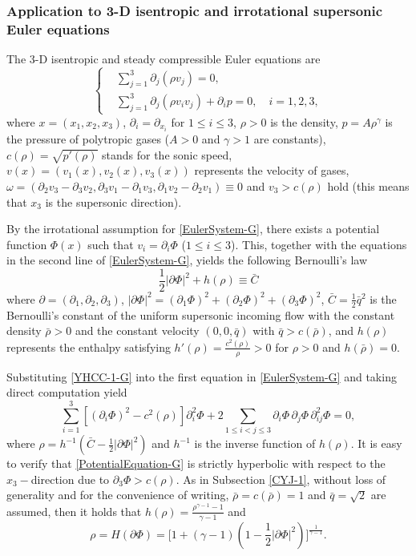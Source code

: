 \documentclass[11pt,twoside]{article}
\def\f{\frac}
\def\p{\partial}
\theoremstyle{plain}
\theoremstyle{definition}
\numberwithin{equation}{section}
\begin{document}
\subsubsection{Application to 3-D isentropic
and irrotational supersonic Euler equations}\label{CYJ-2}

The 3-D isentropic and steady compressible Euler equations are
\begin{equation}\label{EulerSystem-G}
\left\{
\begin{aligned}
&\displaystyle\sum_{j = 1}^{3} \partial_{j} \left( \rho v_{j} \right) = 0, \\
&\displaystyle\sum_{j = 1}^{3} \partial_{j} \left( \rho v_{i} v_{j} \right) + \partial_{i} p = 0 ,\quad i = 1, 2, 3,
\end{aligned}
\right.
\end{equation}
where $x = (x_1, x_2, x_3)$, $\partial_i= \partial_{x_i}$ for $1\le i\le 3$, $\rho>0$ is the density, $p=A\rho^{\gamma}$ is the pressure
of polytropic gases ($A>0$ and $\gamma>1$ are constants), $c(\rho)=\sqrt{p'(\rho)}$ stands for the sonic speed,
$v(x) = \left( v_1(x), v_2(x), v_3(x) \right)$ represents the velocity of gases,
$\omega=(\p_2v_3-\p_3v_2, \p_3v_1-\p_1v_3, \p_1v_2-\p_2v_1)\equiv 0$ and $v_3>c(\rho)$ hold
(this means that $x_3$ is the supersonic direction).

By the irrotational assumption for \eqref{EulerSystem-G}, there exists a potential function $\Phi(x)$
such that $v_i =\partial_i\Phi$ ($1\le i\le 3$). This, together with the equations in the second
line of \eqref{EulerSystem-G}, yields the following Bernoulli's law
\begin{equation}\label{YHCC-1-G}
\frac{1}{2} |\p\Phi|^2 + h(\rho) \equiv {\bar C}
\end{equation}
where $\p=(\p_1,\p_2, \p_3)$, $|\p\Phi|^2=(\p_1\Phi)^2+(\p_2\Phi)^2+(\p_3\Phi)^2$,
${\bar C}=\f12{\bar q}^2$ is the Bernoulli's constant of the uniform supersonic incoming flow
with the constant density $\bar\rho>0$ and the constant velocity $(0,0,\bar q)$ with $\bar q>c(\bar \rho)$,
and $h(\rho)$ represents the enthalpy satisfying $h'(\rho) = \frac{c^2(\rho)}{\rho}>0$ for $\rho>0$ and $h(\bar \rho)=0$.

Substituting \eqref{YHCC-1-G} into the first equation in \eqref{EulerSystem-G} and taking direct computation yield
\begin{equation}\label{PotentialEquation-G}
\sum_{i = 1}^{3}[\left(\partial_i\Phi\right)^2-c^2(\rho)]\partial_i^2\Phi + 2 \sum_{1 \leq i < j \leq 3} \partial_i \Phi \, \partial_j \Phi \, \partial_{ij}^2 \Phi = 0,
\end{equation}
where $\rho=h^{-1}(\bar C-\f12|\p\Phi|^2)$ and $h^{-1}$ is the inverse function of $h(\rho)$.
It is easy to verify that \eqref{PotentialEquation-G} is strictly hyperbolic with respect to the $x_3-$direction due to $\p_3\Phi>c(\rho)$.
As in Subsection \ref{CYJ-1}, without loss of generality and for the convenience of writing, $\bar\rho=c(\bar\rho)=1$ and $\bar q=\sqrt{2}$ are assumed,  then it holds that $h(\rho)=\f{\rho^{\gamma-1}-1}{\gamma-1}$ and
\begin{equation}\label{YHH-12-G}
\rho=H(\p\Phi)=\big[1+(\gamma-1)(1-\f12|\p\Phi|^2)\big]^{\f{1}{\gamma-1}}.
\end{equation}
\end{document}
